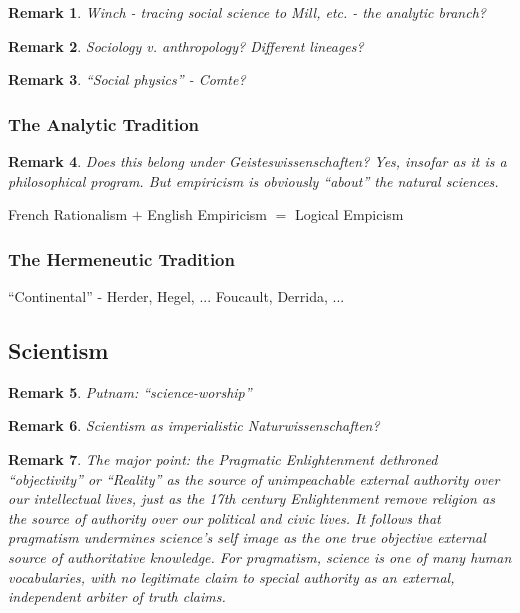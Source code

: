 \documentclass[11pt,twoside]{article}
\newtheorem{remark}{Remark}
\begin{document}
\begin{remark}
  Winch - tracing social science to Mill, etc. - the analytic branch?
\end{remark}

\begin{remark}
  Sociology v. anthropology?  Different lineages?
\end{remark}

\begin{remark}
  ``Social physics'' - Comte?
\end{remark}

\subsubsection{The Analytic Tradition}

\begin{remark}
  Does this belong under Geisteswissenschaften?  Yes, insofar as it is
  a philosophical program.  But empiricism is obviously ``about'' the
  natural sciences.
\end{remark}

French Rationalism $+$ English Empiricism $=$ Logical Empicism

\subsubsection{The Hermeneutic Tradition}

``Continental'' - Herder, Hegel, ... Foucault, Derrida, ...

\cite{forster_herder_2010}

\subsection{Scientism}

\begin{remark}
  Putnam: ``science-worship''
\end{remark}

\begin{remark}
  Scientism as imperialistic Naturwissenschaften?
\end{remark}

\begin{remark}
  The major point: the Pragmatic Enlightenment dethroned
  ``objectivity'' or ``Reality'' as the source of unimpeachable
  external authority over our intellectual lives, just as the 17th
  century Enlightenment remove religion as the source of authority
  over our political and civic lives.  It follows that pragmatism
  undermines science's self image as the one true objective external
  source of authoritative knowledge.  For pragmatism, science is one
  of many human vocabularies, with no legitimate claim to special
  authority as an external, independent arbiter of truth claims.
\end{remark}
\end{document}
